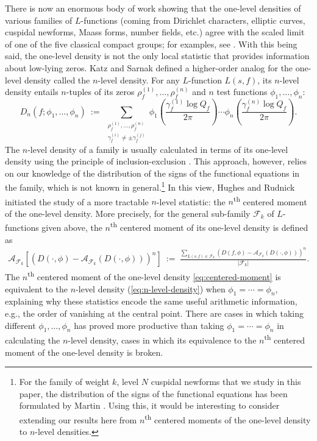 \documentclass[12pt, reqno,oneside]{amsart}
\theoremstyle{plain}
\theoremstyle{definition}
\theoremstyle{remark}
\theoremstyle{plain}
\numberwithin{equation}{section}
\begin{document}
There is now an enormous body of work showing that the one-level densities of various families of $L$-functions (coming from Dirichlet characters, elliptic curves, cuspidal newforms, Maass forms, number fields, etc.) agree with the scaled limit of one of the five classical compact groups; for examples, see \cite{Alp+15,Bar+17,BCL24,DM06,FM15,GK12,ILS00,KR18,RR07,You06}. With this being said, the one-level density is not the only local statistic that provides information about low-lying zeros. Katz and Sarnak defined a higher-order analog for the one-level density called the $n$-level density. For any $L$-function $L(s,f)$, its $n$-level density entails $n$-tuples of its zeros $\rho_f^{(1)},\dots,\rho_f^{(n)}$ and $n$ test functions $\phi_1,\dots,\phi_n$:
\begin{equation}\label{eq:n-level-density}
    D_n(f;\phi_1,\dots,\phi_n) \ := \ \sum_{\substack{\rho_f^{(1)},\dots,\rho_f^{(n)} \\ \gamma_f^{(i)}\neq\pm\gamma_f^{(j)}}}\phi_1\left(\frac{\gamma_f^{(1)}\log Q_f}{2\pi}\right)\cdots\phi_n\left(\frac{\gamma_f^{(n)}\log Q_f}{2\pi}\right).
\end{equation} 
The $n$-level density of a family is usually calculated in terms of its one-level density using the principle of inclusion-exclusion \cite{Rub01, Gao08}. This approach, however, relies on our knowledge of the distribution of the signs of the functional equations in the family, which is not known in general.\footnote{For the family of weight $k$, level $N$ cuspidal newforms that we study in this paper, the distribution of the signs of the functional equations has been formulated by Martin \cite[Theorem 1.2]{Mar23}. Using this, it would be interesting to consider extending our results here from $n$\textsuperscript{th} centered moments of the one-level density to $n$-level densities.} In this view, Hughes and Rudnick \cite{HR02} initiated the study of a more tractable $n$-level statistic: the $n$\textsuperscript{th} centered moment of the one-level density. More precisely, for the general sub-family $\mathcal{F}_k$ of $L$-functions given above, the $n$\textsuperscript{th} centered moment of its one-level density is defined as
\begin{align}\label{eq:centered-moment}
    \mathcal{A}_{\mathcal{F}_k}\left[\left(D(\cdot,\phi)-\mathcal{A}_{\mathcal{F}_k}(D(\cdot,\phi))\right)^n\right] \ := \ \frac{\sum_{L(s,f)\in\mathcal{F}_k}\left(D(f,\phi)-\mathcal{A}_{\mathcal{F}_k}(D(\cdot,\phi))\right)^n}{|\mathcal{F}_k|}.
\end{align}
The $n$\textsuperscript{th} centered moment of the one-level density \eqref{eq:centered-moment} is equivalent to the $n$-level density (\ref{eq:n-level-density}) when $\phi_1=\cdots=\phi_n$, explaining why these statistics encode the same useful arithmetic information, e.g., the order of vanishing at the central point. There are cases \cite{Che+25} in which taking different $\phi_1,\dots,\phi_n$ has proved more productive than taking $\phi_1=\cdots=\phi_n$ in calculating the $n$-level density, cases in which its equivalence to the $n$\textsuperscript{th} centered moment of the one-level density is broken. 
\end{document}
